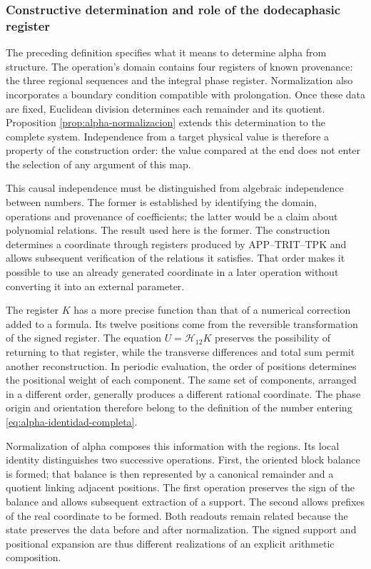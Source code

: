 \subsubsection{Constructive determination and role of the dodecaphasic register}
\label{alpha-ampl-dependencias}

The preceding definition specifies what it means to determine alpha from
structure. The operation's domain contains four registers of
known provenance: the three regional sequences and the integral phase
register. Normalization also incorporates a boundary condition
compatible with prolongation. Once these data are fixed, Euclidean
division determines each remainder and its quotient. Proposition
\ref{prop:alpha-normalizacion} extends this determination to the complete
system. Independence from a target physical value is therefore
a property of the construction order: the value compared at the
end does not enter the selection of any argument of this
map.

This causal independence must be distinguished from algebraic independence
between numbers. The former is established by identifying the domain,
operations and provenance of coefficients; the latter would be a
claim about polynomial relations. The result used here is the
former. The construction determines a coordinate through registers
produced by APP--TRIT--TPK and allows subsequent verification of the
relations it satisfies. That order makes it possible to use an already
generated coordinate in a later operation without converting it into an external parameter.

The register $K$ has a more precise function than that of a numerical
correction added to a formula. Its twelve positions come from the
reversible transformation of the signed register. The equation
$U=\mathcal H_{12}K$ preserves the possibility of returning to that register,
while the transverse differences and total sum permit another
reconstruction. In periodic evaluation, the order of positions
determines the positional weight of each component. The same set of
components, arranged in a different order, generally produces a different rational
coordinate. The phase origin and orientation therefore belong to the
definition of the number entering \eqref{eq:alpha-identidad-completa}.

Normalization of alpha composes this information with the regions. Its
local identity distinguishes two successive operations. First, the oriented
block balance is formed; that balance is then represented by
a canonical remainder and a quotient linking adjacent positions. The first
operation preserves the sign of the balance and allows subsequent extraction
of a support. The second allows prefixes of the real
coordinate to be formed. Both readouts remain related because the state preserves the
data before and after normalization. The signed support and
positional expansion are thus different realizations of an explicit arithmetic
composition.

